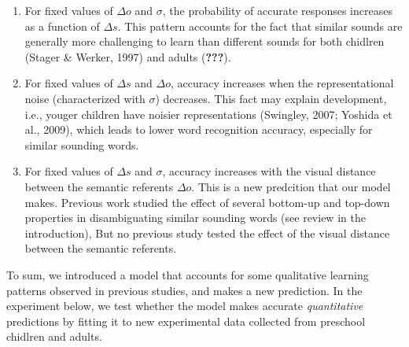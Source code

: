 \documentclass[10pt, letterpaper]{article}
\begin{document}
\begin{enumerate}
\def\labelenumi{\arabic{enumi})}
\item
  For fixed values of \(\Delta o\) and \(\sigma\), the probability of
  accurate responses increases as a function of \(\Delta s\). This
  pattern accounts for the fact that similar sounds are generally more
  challenging to learn than different sounds for both chidlren (Stager
  \& Werker, 1997) and adults ({\textbf{???}}).
\item
  For fixed values of \(\Delta s\) and \(\Delta o\), accuracy increases
  when the representational noise (characterized with \(\sigma\))
  decreases. This fact may explain development, i.e., youger children
  have noisier representations (Swingley, 2007; Yoshida et al., 2009),
  which leads to lower word recognition accuracy, especially for similar
  sounding words.
\item
  For fixed values of \(\Delta s\) and \(\sigma\), accuracy increases
  with the visual distance between the semantic referents \(\Delta o\).
  This is a new predcition that our model makes. Previous work studied
  the effect of several bottom-up and top-down properties in
  disambiguating similar sounding words (see review in the
  introduction), But no previous study tested the effect of the visual
  distance between the semantic referents.
\end{enumerate}

To sum, we introduced a model that accounts for some qualitative
learning patterns observed in previous studies, and makes a new
prediction. In the experiment below, we test whether the model makes
accurate \emph{quantitative} predictions by fitting it to new
experimental data collected from preschool chidlren and adults.
\end{document}
